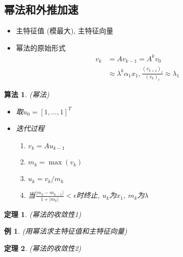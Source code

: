 \documentclass[twoside]{article}
\newtheorem{theorem}{定理}[section]
\newtheorem{algo}{算法}[section]
\newtheorem{eg}{例}[section]
\begin{document}
\subsection{幂法和外推加速}
\begin{itemize}
  \item 主特征值 (模最大), 主特征向量
  \item 幂法的原始形式
    \begin{equation}
      \begin{aligned}
        v_k &= A v_{k-1} = A^k v_0 \\
            &\approx \lambda^k \alpha_1 x_1, \frac{{ (v_{k+1}) }_l}{{ (v_k) }_l}\approx \lambda_1
      \end{aligned}
    \end{equation}
\end{itemize}
\begin{algo}
  (幂法)
  \begin{itemize}
    \item 取$u_0 = [1,\ldots,1]^T$
    \item 迭代过程
      \begin{enumerate}
        \item $v_k = A u_{k-1}$
        \item $m_k=\max{(v_k)}$
        \item $u_k=v_k/m_k$
        \item 当$\frac{|m_k-m_{k-1}|}{1+|m_k|}<\epsilon$时终止, $u_k$为$x_1$, $m_k$为$\lambda$
      \end{enumerate}
  \end{itemize}
\end{algo}
\begin{theorem}
  (幂法的收敛性1)
\end{theorem}
\begin{eg}
  (用幂法求主特征值和主特征向量)
\end{eg}
\begin{theorem}
  (幂法的收敛性2)
\end{theorem}
\end{document}
